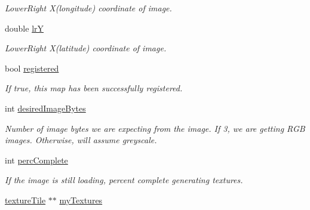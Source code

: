 \begin{DoxyCompactItemize}
\begin{DoxyCompactList}\small\item\em LowerRight X(longitude) coordinate of image. \end{DoxyCompactList}\item 
\hypertarget{class_geomap3_d_a88f90b24be76aba9f9e0c27b1319a4f9}{
double \hyperlink{class_geomap3_d_a88f90b24be76aba9f9e0c27b1319a4f9}{lrY}}
\label{class_geomap3_d_a88f90b24be76aba9f9e0c27b1319a4f9}

\begin{DoxyCompactList}\small\item\em LowerRight X(latitude) coordinate of image. \end{DoxyCompactList}\item 
\hypertarget{class_geomap3_d_aa1706b254fce6036442eb3931801acfc}{
bool \hyperlink{class_geomap3_d_aa1706b254fce6036442eb3931801acfc}{registered}}
\label{class_geomap3_d_aa1706b254fce6036442eb3931801acfc}

\begin{DoxyCompactList}\small\item\em If true, this map has been successfully registered. \end{DoxyCompactList}\item 
\hypertarget{class_geomap3_d_a90e78548f45bc5ba4b8226c60ce7a509}{
int \hyperlink{class_geomap3_d_a90e78548f45bc5ba4b8226c60ce7a509}{desiredImageBytes}}
\label{class_geomap3_d_a90e78548f45bc5ba4b8226c60ce7a509}

\begin{DoxyCompactList}\small\item\em Number of image bytes we are expecting from the image. If 3, we are getting RGB images. Otherwise, will assume greyscale. \end{DoxyCompactList}\item 
\hypertarget{class_geomap3_d_a1496b2017803422a07b8d42cf6e2b7a8}{
int \hyperlink{class_geomap3_d_a1496b2017803422a07b8d42cf6e2b7a8}{percComplete}}
\label{class_geomap3_d_a1496b2017803422a07b8d42cf6e2b7a8}

\begin{DoxyCompactList}\small\item\em If the image is still loading, percent complete generating textures. \end{DoxyCompactList}\item 
\hypertarget{class_geomap3_d_a2d7bc75d898265f92a7297c9d9df3a0a}{
\hyperlink{structtexture_tile}{textureTile} $\ast$$\ast$ \hyperlink{class_geomap3_d_a2d7bc75d898265f92a7297c9d9df3a0a}{myTextures}}
\label{class_geomap3_d_a2d7bc75d898265f92a7297c9d9df3a0a}


\end{DoxyCompactItemize}
